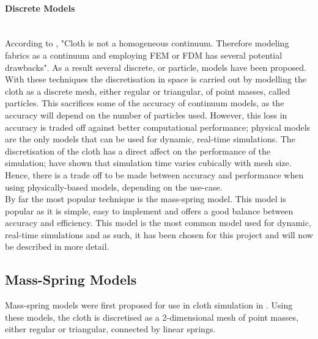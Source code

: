 \paragraph{Discrete Models}\leavevmode\\
According to \textcite[2]{Choi2002}, "Cloth is not a homogeneous continuum. Therefore modeling fabrics as a continuum and employing FEM or FDM has several potential drawbacks". As a result several discrete, or particle, models have been proposed.
\\With these techniques the discretisation in space is carried out by modelling the cloth as a discrete mesh, either regular or triangular, of point masses, called particles. This sacrifices some of the accuracy of continuum models, as the accuracy will depend on the number of particles used. However, this loss in accuracy is traded off against better computational performance; physical models are the only models that can be used for dynamic, real-time simulations. The discretisation of the cloth has a direct affect on the performance of the simulation; \textcite[5]{Volino2001} have shown that simulation time varies cubically with mesh size. Hence, there is a trade off to be made between accuracy and performance when using physically-based models, depending on the use-case.
\\By far the most popular technique is the mass-spring model. This model is popular as it is simple, easy to implement and offers a good balance between accuracy and efficiency. This model is the most common model used for dynamic, real-time simulations and as such, it has been chosen for this project and will now be described in more detail.

\subsection{Mass-Spring Models}
Mass-spring models were first proposed for use in cloth simulation in \textcite{Provot2001}. Using these models, the cloth is discretised as a 2-dimensional mesh of point masses, either regular or triangular, connected by linear springs.

